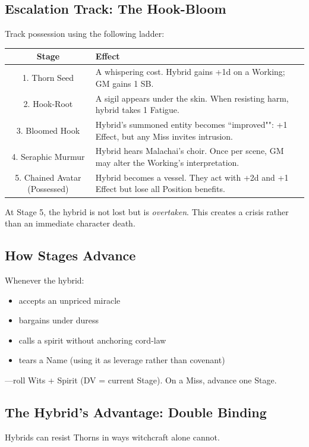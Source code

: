 \documentclass[11pt]{book}
\begin{document}
\subsection*{Escalation Track: The Hook-Bloom}
Track possession using the following ladder:

\begin{center}
\begin{longtable}{|c|p{9cm}|}
\hline
\textbf{Stage} & \textbf{Effect} \\
\hline
1. Thorn Seed & A whispering cost. Hybrid gains +1d on a Working; GM gains 1 SB. \\
\hline
2. Hook-Root & A sigil appears under the skin. When resisting harm, hybrid takes 1 Fatigue. \\
\hline
3. Bloomed Hook & Hybrid's summoned entity becomes ``improved"": +1 Effect, but any Miss invites intrusion. \\
\hline
4. Seraphic Murmur & Hybrid hears Malachai's choir. Once per scene, GM may alter the Working's interpretation. \\
\hline
5. Chained Avatar (Possessed) & Hybrid becomes a vessel. They act with +2d and +1 Effect but lose all Position benefits. \\
\hline
\end{longtable}
\end{center}

At Stage 5, the hybrid is not lost but is \emph{overtaken}.  
This creates a crisis rather than an immediate character death.

\subsection*{How Stages Advance}
Whenever the hybrid:
\begin{itemize}[leftmargin=1.5em]
    \item accepts an unpriced miracle  
    \item bargains under duress  
    \item calls a spirit without anchoring cord-law  
    \item tears a Name (using it as leverage rather than covenant)
\end{itemize}

---roll Wits + Spirit (DV = current Stage).  
On a Miss, advance one Stage.

\subsection*{The Hybrid's Advantage: Double Binding}
Hybrids can resist Thorns in ways witchcraft alone cannot.
\end{document}
